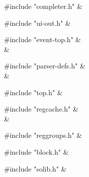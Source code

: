 \medskip
\begin{cxreftabi}
{\stt \#include "completer.h"} &\\
\end{cxreftabi}

\medskip
\begin{cxreftabi}
{\stt \#include "ui-out.h"} &\\
\end{cxreftabi}

\medskip
\begin{cxreftabi}
{\stt \#include "event-top.h"} &\\
\hspace*{0.2in}{\stt \#include <signal.h>} &\\
\end{cxreftabi}

\medskip
\begin{cxreftabi}
{\stt \#include "parser-defs.h"} &\\
\hspace*{0.2in}{\stt \#include "doublest.h"} &\\
\end{cxreftabi}

\medskip
\begin{cxreftabi}
{\stt \#include "top.h"} &\\
\end{cxreftabi}

\medskip
\begin{cxreftabi}
{\stt \#include "regcache.h"} &\\
\hspace*{0.2in}{\stt \#include "../include/ansidecl.h"} &\\
\end{cxreftabi}

\medskip
\begin{cxreftabi}
{\stt \#include "reggroups.h"} &\\
\end{cxreftabi}

\medskip
\begin{cxreftabi}
{\stt \#include "block.h"} &\\
\end{cxreftabi}

\medskip
\begin{cxreftabi}
{\stt \#include "solib.h"} &\\
\end{cxreftabi}

